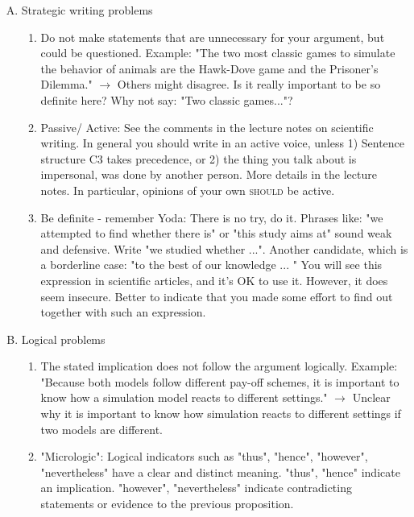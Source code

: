 \documentclass{tufte-book}
\begin{document}
\begin{enumerate}[(A)]


\item Strategic writing problems
\begin{enumerate}
	\item Do not make statements that are unnecessary for your argument, but could be questioned.
	Example: "The two most classic games to simulate the behavior of animals are the Hawk-Dove game and the Prisoner's Dilemma." $\rightarrow$ Others might disagree. Is it really important to be so definite here? Why not say: "Two classic games..."?
	\item Passive/ Active: See the comments in the lecture notes on scientific writing. In general you should write in an active voice, unless  1) Sentence structure C3 takes precedence, or 2) the thing you talk about is impersonal, was done by another person. More details in the lecture notes. In particular, opinions of your own \textsc{should} be active.
	\item Be definite - remember Yoda: There is no try, do it. Phrases like: "we attempted to find whether there is" or "this study aims at" sound weak and defensive. Write "we studied whether ...". Another candidate, which is a borderline case: "to the best of our knowledge ... " You will see this expression in scientific articles, and it's OK to use it. However, it does seem insecure. Better to indicate that you made some effort to find out together with such an expression.



\end{enumerate}

\item Logical problems
\begin{enumerate}
	\item The stated implication does not follow the argument logically. Example: "Because both models follow different pay-off schemes, it is important to know how a simulation model reacts to different settings." $\rightarrow$ Unclear why it is important to know how simulation reacts to different settings if two models are different.
	\item "Micrologic": Logical indicators such as "thus", "hence", "however", "nevertheless" have a clear and distinct meaning. "thus", "hence" indicate an implication. "however", "nevertheless" indicate contradicting statements or evidence to the previous proposition.
\end{enumerate}



\end{enumerate}
\end{document}

